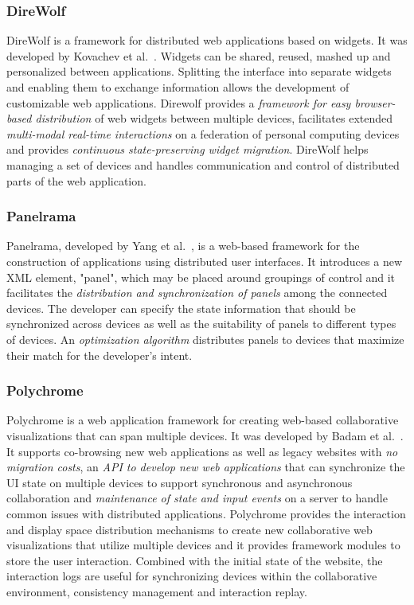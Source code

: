 \subsubsection{DireWolf}

DireWolf is a framework for distributed web applications based on widgets. It was developed by Kovachev et al.~\cite{direwolf2013}. Widgets can be shared, reused, mashed up and personalized between applications. Splitting the interface into separate widgets and enabling them to exchange information allows the development of customizable web applications. Direwolf provides a \emph{framework for easy browser-based distribution} of web widgets between multiple devices, facilitates extended \emph{multi-modal real-time interactions} on a federation of personal computing devices and provides \emph{continuous state-preserving widget migration}. DireWolf helps managing a set of devices and handles communication and control of distributed parts of the web application. 

\subsubsection{Panelrama}

Panelrama, developed by Yang et al.~\cite{panelrama2014}, is a web-based framework for the construction of applications using distributed user interfaces. It introduces a new XML element, "panel", which may be placed around groupings of control and it facilitates the \emph{distribution and synchronization of panels} among the connected devices. The developer can specify the state information that should be synchronized across devices as well as the suitability of panels to different types of devices. An \emph{optimization algorithm} distributes panels to devices that maximize their match for the developer's intent.

\subsubsection{Polychrome}

Polychrome is a web application framework for creating web-based collaborative visualizations that can span multiple devices. It was developed by Badam et al.~\cite{polychrome2014}. It supports co-browsing new web applications as well as legacy websites with \emph{no migration costs}, an \emph{API to develop new web applications} that can synchronize the UI state on multiple devices to support synchronous and asynchronous collaboration and \emph{maintenance of state and input events} on a server to handle common issues with distributed applications. Polychrome provides the interaction and display space distribution mechanisms to create new collaborative web visualizations that utilize multiple devices and it provides framework modules to store the user interaction. Combined with the initial state of the website, the interaction logs are useful for synchronizing devices within the collaborative environment, consistency management and interaction replay.

